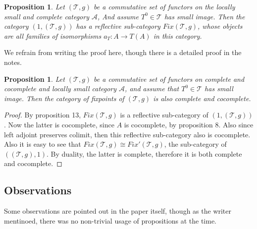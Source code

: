 \documentclass[12pt]{article}
\newcounter{the}
\newtheorem{proposition}[the]{Proposition}
\begin{document}
\begin{proposition}
    Let $(\mathscr T, g)$ be a commutative set of functors on the locally small and complete category $\mathscr A$, And assume $T^0 \in \mathscr T$ has small image. Then the category $(1, (\mathscr T, g))$ has a reflective sub-category $Fix (\mathscr T, g)$, whose objects are all families of isomorphisms $a_T: A \to T(A)$ in this category.
\end{proposition}
We refrain from writing the proof here, though there is a detailed proof in the notes. 
\begin{proposition}
    Let $(\mathscr T, g)$ be a commutative set of functors on complete and cocomplete and locally small category $\mathscr A$, and assume that $T^0 \in \mathscr T$ has small image. Then the category of fixpoints of $(\mathscr T, g)$ is also complete and cocomplete.
\end{proposition}
\begin{proof}
    By proposition 13, $Fix (\mathscr T, g)$ is a reflective sub-category of $(1, (\mathscr T, g))$. Now the latter is cocomplete, since $A$ is cocomplete, by proposition 8. Also since left adjoint preserves colimit, then this reflective sub-category also is cocomplete. Also it is easy to see that $Fix (\mathscr T, g) \cong Fix' (\mathscr T, g)$, the sub-category of $((\mathscr T, g), 1)$. By duality, the latter is complete, therefore it is both complete and cocomplete.
\end{proof}


\subsection*{Observations}
Some observations are pointed out in the paper itself, though as the writer mentinoed, there was no non-trivial usage of propositions at the time.
\end{document}
